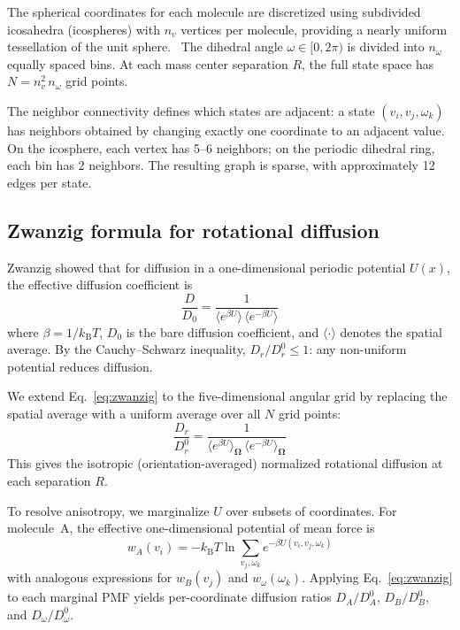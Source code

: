 \documentclass[aps,jcp,reprint,superscriptaddress]{revtex4-2}
\newcommand{\kB}{k_\mathrm{B}}
\newcommand{\avg}[1]{\langle #1 \rangle}
\newcommand{\DD}{D_r/D_r^0}
\begin{document}
The spherical coordinates for each molecule are discretized using subdivided
icosahedra (icospheres) with $n_v$ vertices per molecule, providing a nearly
uniform tessellation of the unit sphere.~\cite{duello2025}
The dihedral angle $\omega \in [0, 2\pi)$ is divided into $n_\omega$
equally spaced bins.
At each mass center separation $R$, the full state space has
$N = n_v^2 \, n_\omega$ grid points.

The neighbor connectivity defines which states are adjacent:
a state $(v_i, v_j, \omega_k)$ has neighbors obtained by changing exactly one
coordinate to an adjacent value.
On the icosphere, each vertex has 5--6 neighbors; on the periodic dihedral ring,
each bin has 2 neighbors.
The resulting graph is sparse, with approximately 12 edges per state.

\subsection{Zwanzig formula for rotational diffusion}
\label{sec:zwanzig}

Zwanzig showed that for diffusion in a one-dimensional periodic potential $U(x)$,
the effective diffusion coefficient is~\cite{zwanzig1988}
\begin{equation}
  \frac{D}{D_0} = \frac{1}{\avg{e^{\beta U}} \, \avg{e^{-\beta U}}}
  \label{eq:zwanzig}
\end{equation}
where $\beta = 1/\kB T$, $D_0$ is the bare diffusion coefficient,
and $\avg{\cdot}$ denotes the spatial average.
By the Cauchy--Schwarz inequality, $\DD \le 1$: any non-uniform potential
reduces diffusion.

We extend Eq.~\eqref{eq:zwanzig} to the five-dimensional angular grid by
replacing the spatial average with a uniform average over all $N$ grid points:
\begin{equation}
  \frac{D_r}{D_r^0} = \frac{1}{\avg{e^{\beta U}}_{\bm{\Omega}} \, \avg{e^{-\beta U}}_{\bm{\Omega}}}
  \label{eq:zwanzig5d}
\end{equation}
This gives the isotropic (orientation-averaged) normalized rotational diffusion
at each separation $R$.

To resolve anisotropy, we marginalize $U$ over subsets of coordinates.
For molecule~A, the effective one-dimensional potential of mean force is
\begin{equation}
  w_A(v_i) = -\kB T \ln \sum_{v_j, \omega_k} e^{-\beta U(v_i, v_j, \omega_k)}
  \label{eq:pmf_marginal}
\end{equation}
with analogous expressions for $w_B(v_j)$ and $w_\omega(\omega_k)$.
Applying Eq.~\eqref{eq:zwanzig} to each marginal PMF yields per-coordinate
diffusion ratios $D_A/D_A^0$, $D_B/D_B^0$, and $D_\omega/D_\omega^0$.
\end{document}
